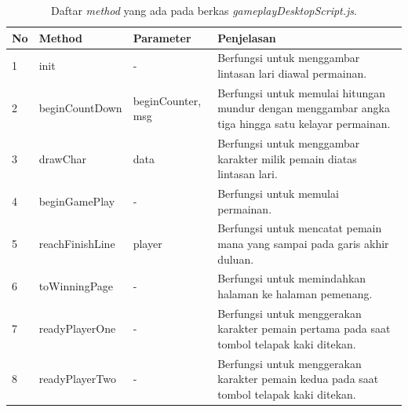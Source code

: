 \begin{enumerate}
\begin{enumerate}
\begin{enumerate}
			\begin{table}[H]
				\centering
				\caption{Daftar \textit{method} yang ada pada berkas \textit{gameplayDesktopScript.js}.}
				\begin{tabular}{|p{0.35cm}|p{3cm}|p{3cm}|p{7cm}|}
					\hline
					No & Method & Parameter & Penjelasan \\ \hline
					1 & init & - & Berfungsi untuk menggambar lintasan lari diawal permainan. \\ \hline
					2 & beginCountDown & beginCounter, msg & Berfungsi untuk memulai hitungan mundur dengan menggambar angka tiga hingga satu kelayar permainan. \\ \hline
					3 & drawChar & data & Berfungsi untuk menggambar karakter milik pemain diatas lintasan lari. \\ \hline
					4 & beginGamePlay & - & Berfungsi untuk memulai permainan. \\ \hline
					5 & reachFinishLine & player & Berfungsi untuk mencatat pemain mana yang sampai pada garis akhir duluan. \\ \hline
					6 & toWinningPage & - & Berfungsi untuk memindahkan halaman ke halaman pemenang. \\ \hline
					7 & readyPlayerOne & - & Berfungsi untuk menggerakan karakter pemain pertama pada saat tombol telapak kaki ditekan. \\ \hline
					8 & readyPlayerTwo & - & Berfungsi untuk menggerakan karakter pemain kedua pada saat tombol telapak kaki ditekan. \\ \hline
				\end{tabular}
				\label{table:method_gameplayDesktopScript}
			\end{table}
			

\end{enumerate}
\end{enumerate}
\end{enumerate}
